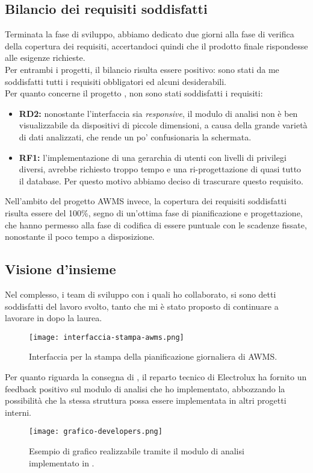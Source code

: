 \subsection{Bilancio dei requisiti soddisfatti}
Terminata la fase di sviluppo, abbiamo dedicato due giorni alla fase di verifica della copertura dei requisiti, accertandoci quindi che il prodotto finale rispondesse alle esigenze richieste.\\
Per entrambi i progetti, il bilancio risulta essere positivo: sono stati da me soddisfatti tutti i requisiti obbligatori ed alcuni desiderabili.\\
Per quanto concerne il progetto \DS{}, non sono stati soddisfatti i requisiti:
\begin{itemize}
    \item \textbf{RD2:} nonostante l'interfaccia sia \textit{responsive}, il modulo di analisi non è ben visualizzabile da dispositivi di piccole dimensioni, a causa della grande varietà di dati analizzati, che rende un po' confusionaria la schermata.  
    \item \textbf{RF1:} l'implementazione di una gerarchia di utenti con livelli di privilegi diversi, avrebbe richiesto troppo tempo e una ri-progettazione di quasi tutto il database. Per questo motivo abbiamo deciso di trascurare questo requisito.
\end{itemize}
Nell'ambito del progetto AWMS invece, la copertura dei requisiti soddisfatti risulta essere del 100\%{}, segno di un'ottima fase di pianificazione e progettazione, che hanno permesso alla fase di codifica di essere puntuale con le scadenze fissate, nonostante il poco tempo a disposizione.
\subsection{Visione d'insieme}
Nel complesso, i team di sviluppo con i quali ho collaborato, si sono detti soddisfatti del lavoro svolto, tanto che mi è stato proposto di continuare a lavorare in \AD{} dopo la laurea.\\
\begin{figure}[h]
\centering
\texttt{[image: interfaccia-stampa-awms.png]} 
\caption{Interfaccia per la stampa della pianificazione giornaliera di AWMS.}
\end{figure}

Per quanto riguarda la consegna di \DS{}, il reparto tecnico di Electrolux ha fornito un \gls{feedback} positivo sul modulo di analisi che ho implementato, abbozzando la possibilità che la stessa struttura possa essere implementata in altri progetti interni. 
\begin{figure}[h]
\centering
\texttt{[image: grafico-developers.png]} 
\caption{Esempio di grafico realizzabile tramite il modulo di analisi implementato in \DS{}.}
\end{figure}

